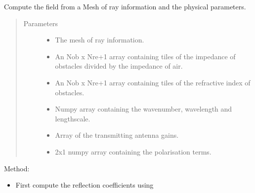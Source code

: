 \documentclass[letterpaper,10pt,english]{sphinxmanual}
\begin{document}
\begin{fulllineitems}
\label{\detokenize{index:DictionarySparseMatrix.quality_compute}}
Compute the field from a Mesh of ray information and the physical   parameters.
\begin{quote}\begin{description}
\item[{Parameters}] \leavevmode\begin{itemize}
\item {} 
 \textendash{} The {\hyperref[\detokenize{index:DictionarySparseMatrix.DS}]{}} mesh of ray information.

\item {} 
 \textendash{} An Nob x Nre+1 array containing tiles of the impedance     of obstacles divided by the impedance of air.

\item {} 
 \textendash{} An Nob x Nre+1 array containing tiles of the refractive    index of obstacles.

\item {} 
 \textendash{} Numpy array containing the wavenumber, wavelength and lengthscale.

\item {} 
 \textendash{} Array of the transmitting antenna gains.

\item {} 
 \textendash{} 2x1 numpy array containing the polarisation terms.

\end{itemize}

\end{description}\end{quote}

Method:
\begin{itemize}
\item {} 
First compute the reflection coefficients using     


\end{itemize}
\end{fulllineitems}
\end{document}
